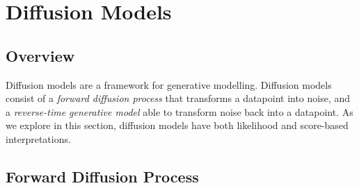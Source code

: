 \documentclass[ oneside,%
                    author={George Herbert},
                    degree={MSci},
                     title={Diffusion Models for Time-Evolving Precipitation Fields},
                  subtitle={}]{dissertation}
\begin{document}
\section{Diffusion Models}
\label{sec:background_diffusion}

\subsection{Overview}
\label{sec:background_diffusion_overview}

Diffusion models \cite{Deep_Unsupervised_Learning_Sohl-Dickstein,DDPM_Ho,Score_Based_Song} are a framework for generative modelling. Diffusion models consist of a \textit{forward diffusion process} that transforms a datapoint into noise, and a \textit{reverse-time generative model} able to transform noise back into a datapoint. As we explore in this section, diffusion models have both likelihood and score-based interpretations.

\subsection{Forward Diffusion Process}
\label{sec:background_diffusion_forward}
\end{document}
